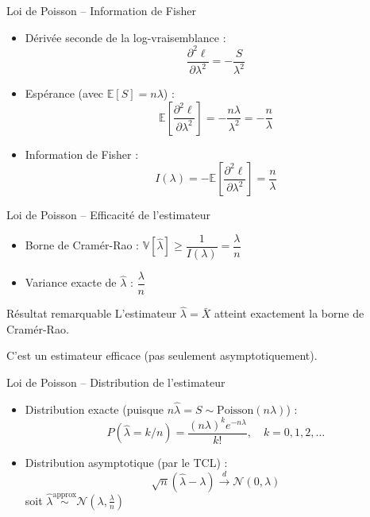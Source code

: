 \documentclass[11pt,aspectratio=169]{beamer}
\begin{document}
\begin{frame}{Loi de Poisson -- Information de Fisher}

\begin{itemize}

\item Dérivée seconde de la log-vraisemblance :
  \[
  \frac{\partial^2 \ell}{\partial \lambda^2} = -\frac{S}{\lambda^2}
  \]

\item Espérance (avec $\mathbb{E}[S] = n\lambda$) :
  \[
  \mathbb{E}\left[\frac{\partial^2 \ell}{\partial \lambda^2}\right] = -\frac{n\lambda}{\lambda^2} = -\frac{n}{\lambda}
  \]

\item Information de Fisher :
  \[
  \boxed{I(\lambda) = -\mathbb{E}\left[\frac{\partial^2 \ell}{\partial \lambda^2}\right] = \frac{n}{\lambda}}
  \]

\end{itemize}

\end{frame}

\begin{frame}{Loi de Poisson -- Efficacité de l'estimateur}

\begin{itemize}

\item Borne de Cramér-Rao : $\mathbb{V}[\hat{\lambda}] \geq \dfrac{1}{I(\lambda)} = \dfrac{\lambda}{n}$\newline

\item Variance exacte de $\hat{\lambda}$ : $\dfrac{\lambda}{n}$

\end{itemize}

\begin{alertblock}{Résultat remarquable}
L'estimateur $\hat{\lambda} = \bar{X}$ atteint exactement la borne de Cramér-Rao.

C'est un estimateur efficace (pas seulement asymptotiquement).
\end{alertblock}

\end{frame}

\begin{frame}{Loi de Poisson -- Distribution de l'estimateur}

\begin{itemize}

\item Distribution exacte (puisque $n\hat{\lambda} = S \sim \text{Poisson}(n\lambda)$) :
  \[
  P(\hat{\lambda} = k/n) = \frac{(n\lambda)^k e^{-n\lambda}}{k!}, \quad k = 0, 1, 2, \ldots
  \]

\item Distribution asymptotique (par le TCL) :
  \[
  \sqrt{n}(\hat{\lambda} - \lambda) \xrightarrow{d} \mathcal{N}(0, \lambda)
  \]
  soit $\hat{\lambda} \overset{\text{approx}}{\sim} \mathcal{N}\left(\lambda, \frac{\lambda}{n}\right)$

\end{itemize}

\end{frame}
\end{document}
